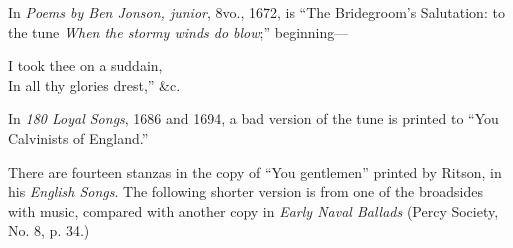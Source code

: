 In \textit{Poems by Ben Jonson, junior}, 8vo., 1672, is “The Bridegroom’s Salutation:
to the tune \textit{When the stormy winds do blow};” beginning—
\settowidth{\versewidth}{In all thy glories drest,” \&c.}
\begin{scverse}
I took thee on a suddain,\\
\vin In all thy glories drest,” \&c.
\end{scverse}

In \textit{180 Loyal Songs}, 1686 and 1694, a bad version of the tune is printed to
“You Calvinists of England.”

There are fourteen stanzas in the copy of “You gentlemen” printed by Ritson,
in his \textit{English Songs}. The following shorter version is from one of the broadsides
with music, compared with another copy in \textit{Early Naval Ballads} (Percy Society,
No. 8, p. 34.)
\pagebreak



